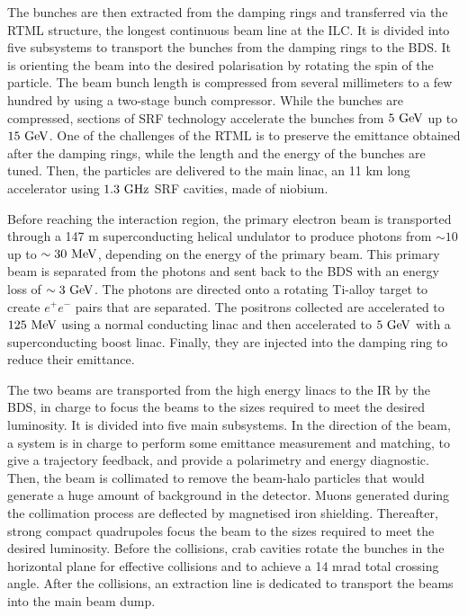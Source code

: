     The bunches are then extracted from the damping rings and transferred via the \gls{RTML} structure, the longest continuous beam line at the \gls{ILC}.
    It is divided into five subsystems to transport the bunches from the damping rings to the \gls{BDS}.
    It is orienting the beam into the desired polarisation by rotating the spin of the particle.
    The beam bunch length is compressed  from several millimeters to a few hundred by using a two-stage bunch compressor.
    While the bunches are compressed, sections of \gls{SRF} technology accelerate the bunches from $5~\rm{GeV}$ up to $15~\rm{GeV}$.
    One of the challenges of the \gls{RTML} is to preserve the emittance obtained after the damping rings, while the length and the energy of the bunches are tuned.
    Then, the particles are delivered to the main linac, an 11 km long accelerator using $1.3~\rm{GHz}$ \gls{SRF} cavities, made of niobium.

    Before reaching the interaction region, the primary electron beam is transported through a 147 m superconducting helical undulator to produce photons from $\sim 10$ up to $\sim 30~\rm{MeV}$, depending on the energy of the primary beam.
    This primary beam is separated from the photons and sent back to the \gls{BDS} with an energy loss of $\sim 3~\rm{GeV}$.
    The photons are directed onto a rotating Ti-alloy target to create $e^+e^-$ pairs that are separated.
    The positrons collected are accelerated to $125~\rm{MeV}$ using a normal conducting linac and then accelerated to $5~\rm{GeV}$ with a superconducting boost linac.
    Finally, they are injected into the damping ring to reduce their emittance.

    The two beams are transported from the high energy linacs to the \gls{IR} by the \gls{BDS}, in charge to focus the beams to the sizes required to meet the desired luminosity.
    It is divided into five main subsystems. 
    In the direction of the beam, a system is in charge to perform some emittance measurement and matching, to give a trajectory feedback, and provide a polarimetry and energy diagnostic. 
    Then, the beam is collimated to remove the beam-halo particles that would generate a huge amount of background in the detector.
    Muons generated during the collimation process are deflected by magnetised iron shielding.
    Thereafter, strong compact quadrupoles focus the beam to the sizes required to meet the desired luminosity. 
    Before the collisions, crab cavities rotate the bunches in the horizontal plane for effective collisions and to achieve a 14 mrad total crossing angle.
    After the collisions, an extraction line is dedicated to transport the beams into the main beam dump.

